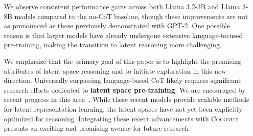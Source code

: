 \documentclass[]{fairmeta}
\newcommand{\ours}{\textsc{Coconut}\xspace}
\begin{document}
We observe consistent performance gains across both Llama 3.2-3B and Llama 3-8B models compared to the no-CoT baseline, though these improvements are not as pronounced as those previously demonstrated with GPT-2. One possible reason is that larger models have already undergone extensive language-focused pre-training, making the transition to latent reasoning more challenging.

We emphasize that the primary goal of this paper is to highlight the promising attributes of latent-space reasoning and to initiate exploration in this new direction. Universally surpassing language-based CoT likely requires significant research efforts dedicated to \textbf{latent space pre-training}. We are encouraged by recent progress in this area~\citep{geiping2025scaling, barrault2024large, gladstone2025energy}. While these recent models provide scalable methods for latent representation learning, the latent spaces have not yet been explicitly optimized for reasoning. Integrating these recent advancements with \ours presents an exciting and promising avenue for future research.
\end{document}
